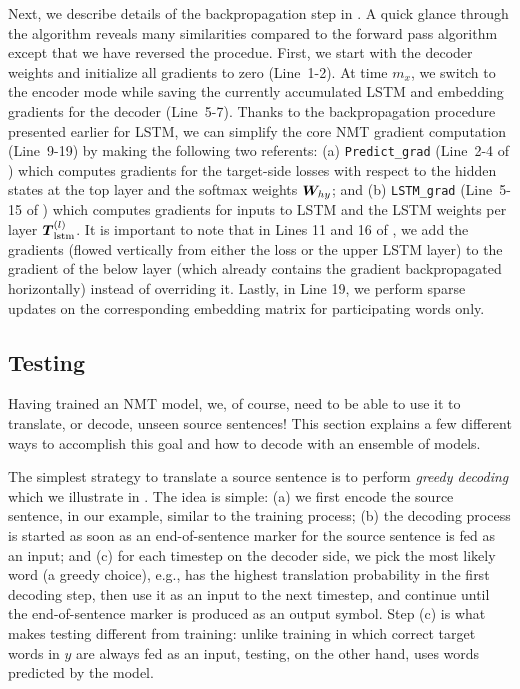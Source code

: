 Next, we describe details of the backpropagation step in .
A quick glance through the algorithm reveals many similarities compared to the
forward pass algorithm except that we have reversed the procedue. First, we
start with the decoder weights and initialize all gradients to zero (Line~1-2).
At time $m_x$, we switch to the encoder mode while saving the currently
accumulated LSTM and embedding gradients for the decoder (Line~5-7). 
Thanks to the backpropagation
procedure presented earlier for LSTM, we can simplify the core NMT gradient
computation (Line~9-19) by making the following two referents: (a)
\texttt{Predict\_grad} (Line~2-4 of ) which computes gradients for the target-side
losses with respect to the hidden states at the top layer and the softmax
weights $\bm{W}_{hy}$; and (b) \texttt{LSTM\_grad} (Line~5-15 of
) which computes gradients for inputs to LSTM and the LSTM
weights per layer $\mbox{\boldmath{$T$}}_{\text{lstm}}^{(l)}$. It is important to note that in Lines 11 and 16 of
, we add the gradients (flowed vertically from either the
loss or the upper LSTM layer) to the gradient of the below layer (which already
contains the gradient backpropagated horizontally)
instead of overriding it. Lastly, in Line 19, we perform
sparse updates on the corresponding embedding matrix for participating words
only.

\subsection{Testing}
Having trained an NMT model, we, of course, need to be able to use it to
translate, or decode, unseen source sentences! This section explains a few different ways to 
accomplish this goal and how to decode with an ensemble of models.

The simplest strategy to translate a source sentence is to perform {\it greedy
decoding} which we illustrate in . The idea is simple: (a) we
first encode the source sentence,
 in our example, similar to the training process; (b) the
decoding process is started as soon as
an end-of-sentence marker \word{\_} for the source sentence is fed as an input; and (c) for each
timestep on the decoder side,
we pick the most likely word (a greedy choice), e.g.,  has the highest
translation probability in the first
decoding step, then use it as an input to the next timestep, and continue
until the end-of-sentence marker \word{\_} is produced as an output symbol. Step
(c) is what makes testing different from training: unlike training in which
correct target words in $y$ are always fed as an input, testing, on the other
hand, uses words predicted by the model.

